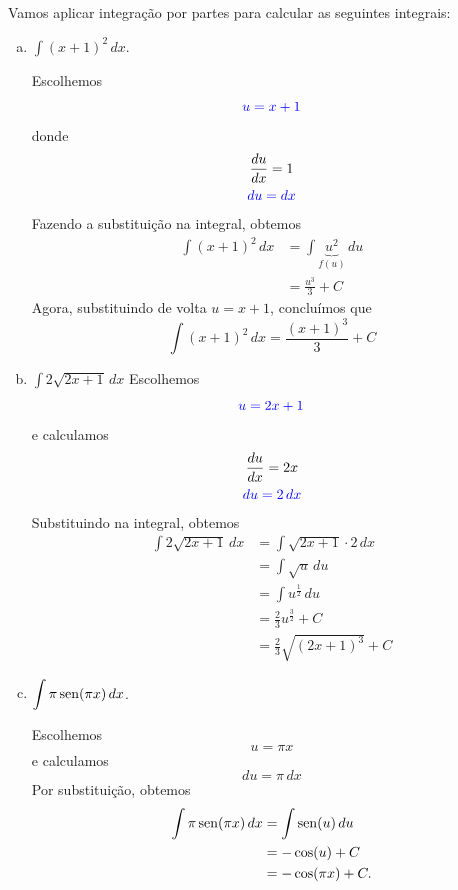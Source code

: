 \begin{ex}
  Vamos aplicar integração por partes para calcular as seguintes integrais:
  \begin{enumerate}[a)]
  \item $\displaystyle\int (x+1)^2\,dx$.

    Escolhemos
    \begin{equation}
      {\color{blue}u = x + 1}
    \end{equation}
    donde
    \begin{gather}
      \frac{du}{dx} = 1\\
      {\color{blue}du = dx}
    \end{gather}
    Fazendo a substituição na integral, obtemos
    \begin{align*}
      \int (x+1)^2\,dx &= \int \underbrace{u^2}_{f(u)}\,du\\
                       &= \frac{u^3}{3} + C
    \end{align*}
    Agora, substituindo de volta $u = x+1$, concluímos que
    \begin{equation}
      \int (x+1)^2\,dx = \frac{(x+1)^3}{3} + C
    \end{equation}

  \item $\displaystyle \int 2\sqrt{2x+1}\,dx$
    Escolhemos
    \begin{equation}
      {\color{blue}u = 2x+1}
    \end{equation}
    e calculamos
    \begin{gather}
      \frac{du}{dx} = 2x\\
      {\color{blue}du = 2\,dx}
    \end{gather}
    Substituindo na integral, obtemos
    \begin{align*}
      \int 2\sqrt{2x+1}\,dx &= \int \sqrt{2x+1}\cdot 2\,dx\\
                            &= \int \sqrt{u}\,du\\
                            &= \int u^{\frac{1}{2}}\,du\\
                            &= \frac{2}{3}u^{\frac{3}{2}} + C\\
                            &= \frac{2}{3}\sqrt{(2x+1)^3} + C
    \end{align*}
    
  \item $\displaystyle\int \pi\operatorname{sen}(\pi x)\,dx$.

    Escolhemos
    \begin{equation}
      u = \pi x
    \end{equation}
    e calculamos
    \begin{equation}
      du = \pi\,dx
    \end{equation}
    Por substituição, obtemos
    \begin{align}
      \int \pi\operatorname{sen}(\pi x)\,dx &= \int \operatorname{sen}(u)\,du \\
                              &= -\cos(u) + C \\
                              &= -\cos(\pi x) + C.
    \end{align}
  \end{enumerate}
\end{ex}

